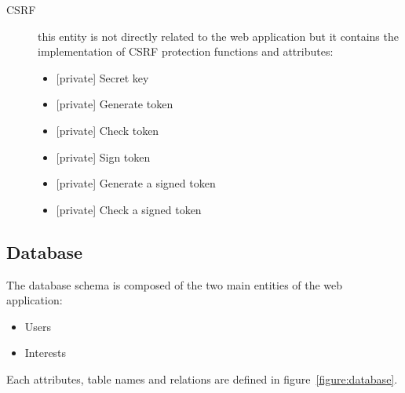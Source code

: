 \documentclass[a4paper,11pt,openany]{report}
\begin{document}
\begin{description}
 \item[CSRF] this entity is not directly related to the web application but it contains the 
 implementation of CSRF protection functions and attributes:
 \begin{itemize}[label=--]
  \item {[}private{]} Secret key
  \item {[}private{]} Generate token
  \item {[}private{]} Check token
  \item {[}private{]} Sign token
  \item {[}private{]} Generate a signed token
  \item {[}private{]} Check a signed token
 \end{itemize}

\end{description}

\subsection{Database}
The database schema is composed of the two main entities of the web application:
\begin{itemize}
 \item Users
 \item Interests
\end{itemize}
Each attributes, table names and relations are defined in figure~\ref{figure:database}.
\end{document}
